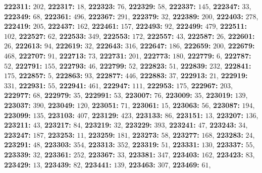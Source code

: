 \textsf{\bfseries 222311:} $202$, \textsf{\bfseries 222317:} $18$, \textsf{\bfseries 222323:} $76$, \textsf{\bfseries 222329:} $58$, \textsf{\bfseries 222337:} $145$, \textsf{\bfseries 222347:} $33$, \textsf{\bfseries 222349:} $68$, \textsf{\bfseries 222361:} $496$, \textsf{\bfseries 222367:} $291$, \textsf{\bfseries 222379:} $32$, \textsf{\bfseries 222389:} $200$, \textsf{\bfseries 222403:} $278$, \textsf{\bfseries 222419:} $205$, \textsf{\bfseries 222437:} $162$, \textsf{\bfseries 222461:} $157$, \textsf{\bfseries 222493:} $92$, \textsf{\bfseries 222499:} $479$, \textsf{\bfseries 222511:} $102$, \textsf{\bfseries 222527:} $62$, \textsf{\bfseries 222533:} $349$, \textsf{\bfseries 222553:} $172$, \textsf{\bfseries 222557:} $43$, \textsf{\bfseries 222587:} $26$, \textsf{\bfseries 222601:} $26$, \textsf{\bfseries 222613:} $94$, \textsf{\bfseries 222619:} $32$, \textsf{\bfseries 222643:} $316$, \textsf{\bfseries 222647:} $186$, \textsf{\bfseries 222659:} $200$, \textsf{\bfseries 222679:} $468$, \textsf{\bfseries 222707:} $91$, \textsf{\bfseries 222713:} $73$, \textsf{\bfseries 222731:} $201$, \textsf{\bfseries 222773:} $180$, \textsf{\bfseries 222779:} $6$, \textsf{\bfseries 222787:} $52$, \textsf{\bfseries 222791:} $155$, \textsf{\bfseries 222793:} $46$, \textsf{\bfseries 222799:} $52$, \textsf{\bfseries 222823:} $51$, \textsf{\bfseries 222839:} $232$, \textsf{\bfseries 222841:} $175$, \textsf{\bfseries 222857:} $5$, \textsf{\bfseries 222863:} $93$, \textsf{\bfseries 222877:} $446$, \textsf{\bfseries 222883:} $37$, \textsf{\bfseries 222913:} $21$, \textsf{\bfseries 222919:} $331$, \textsf{\bfseries 222931:} $55$, \textsf{\bfseries 222941:} $461$, \textsf{\bfseries 222947:} $111$, \textsf{\bfseries 222953:} $175$, \textsf{\bfseries 222967:} $203$, \textsf{\bfseries 222977:} $68$, \textsf{\bfseries 222979:} $35$, \textsf{\bfseries 222991:} $53$, \textsf{\bfseries 223007:} $76$, \textsf{\bfseries 223009:} $35$, \textsf{\bfseries 223019:} $139$, \textsf{\bfseries 223037:} $390$, \textsf{\bfseries 223049:} $120$, \textsf{\bfseries 223051:} $71$, \textsf{\bfseries 223061:} $15$, \textsf{\bfseries 223063:} $56$, \textsf{\bfseries 223087:} $194$, \textsf{\bfseries 223099:} $135$, \textsf{\bfseries 223103:} $407$, \textsf{\bfseries 223129:} $423$, \textsf{\bfseries 223133:} $86$, \textsf{\bfseries 223151:} $13$, \textsf{\bfseries 223207:} $136$, \textsf{\bfseries 223211:} $43$, \textsf{\bfseries 223217:} $84$, \textsf{\bfseries 223219:} $32$, \textsf{\bfseries 223229:} $393$, \textsf{\bfseries 223241:} $47$, \textsf{\bfseries 223243:} $34$, \textsf{\bfseries 223247:} $187$, \textsf{\bfseries 223253:} $11$, \textsf{\bfseries 223259:} $181$, \textsf{\bfseries 223273:} $58$, \textsf{\bfseries 223277:} $168$, \textsf{\bfseries 223283:} $24$, \textsf{\bfseries 223291:} $48$, \textsf{\bfseries 223303:} $354$, \textsf{\bfseries 223313:} $352$, \textsf{\bfseries 223319:} $51$, \textsf{\bfseries 223331:} $130$, \textsf{\bfseries 223337:} $55$, \textsf{\bfseries 223339:} $32$, \textsf{\bfseries 223361:} $252$, \textsf{\bfseries 223367:} $33$, \textsf{\bfseries 223381:} $347$, \textsf{\bfseries 223403:} $162$, \textsf{\bfseries 223423:} $83$, \textsf{\bfseries 223429:} $13$, \textsf{\bfseries 223439:} $82$, \textsf{\bfseries 223441:} $139$, \textsf{\bfseries 223463:} $307$, \textsf{\bfseries 223469:} $61$, 

